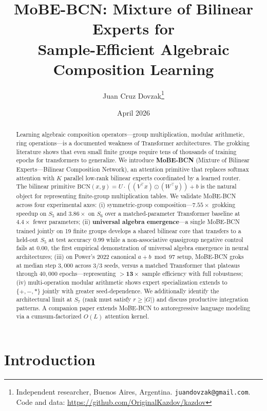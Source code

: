 \documentclass[11pt]{article}
\title{\textbf{MoBE-BCN: Mixture of Bilinear Experts for\\
Sample-Efficient Algebraic Composition Learning}}
\author{Juan Cruz Dovzak\thanks{Independent researcher, Buenos Aires, Argentina.
\texttt{juandovzak@gmail.com}. Code and data:
\url{https://github.com/OriginalKazdov/kazdov}}}
\date{April 2026}
\begin{document}
\maketitle

\begin{abstract}
\noindent
Learning algebraic composition operators---group multiplication, modular
arithmetic, ring operations---is a documented weakness of Transformer
architectures. The grokking literature shows that even small finite groups
require tens of thousands of training epochs for transformers to generalize.
We introduce \textbf{MoBE-BCN} (Mixture of Bilinear Experts---Bilinear
Composition Network), an attention primitive that replaces softmax
attention with $K$ parallel low-rank bilinear experts coordinated by a
learned router. The bilinear primitive $\text{BCN}(x, y) = U \cdot
((V^\top x) \odot (W^\top y)) + b$ is the natural object for representing
finite-group multiplication tables.
We validate MoBE-BCN across four experimental axes:
(i) symmetric-group composition---$\mathbf{7.55\times}$ grokking speedup on
$S_5$ and $\mathbf{3.86\times}$ on $S_6$ over a matched-parameter Transformer
baseline at $\mathbf{4.4\times}$ fewer parameters;
(ii) \textbf{universal algebra emergence}---a single MoBE-BCN trained
jointly on 19 finite groups develops a shared bilinear core that transfers
to a held-out $S_5$ at test accuracy $\mathbf{0.99}$ while a non-associative
quasigroup negative control fails at $\mathbf{0.00}$, the first empirical
demonstration of universal algebra emergence in neural architectures;
(iii) on Power's 2022 canonical \mbox{$a + b \bmod 97$} setup, MoBE-BCN
groks at median step $3{,}000$ across $3/3$ seeds, versus a matched
Transformer that plateaus through $40{,}000$ epochs---representing
$\mathbf{{>}13\times}$ sample efficiency with full robustness;
(iv) multi-operation modular arithmetic shows expert specialization
extends to $\{+, -, \ast\}$ jointly with greater seed-dependence.
We additionally identify the architectural limit at $S_7$ (rank must
satisfy $r \geq |G|$) and discuss productive integration patterns.
A companion paper extends MoBE-BCN to autoregressive language modeling
via a cumsum-factorized $O(L)$ attention kernel.
\end{abstract}

\section{Introduction}
\end{document}
